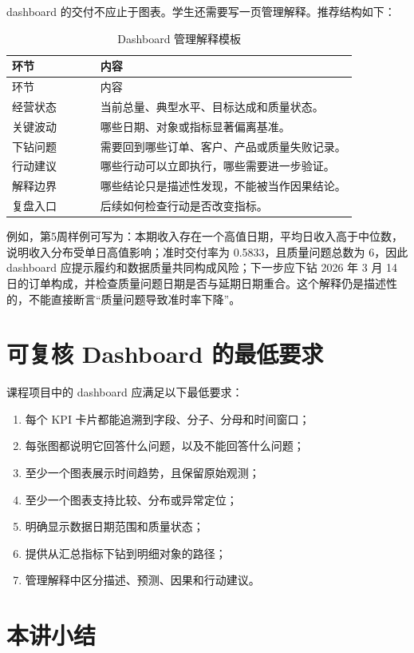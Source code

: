 \documentclass[UTF8,fontset=fandol,openany,zihao=-4]{ctexbook}
\begin{document}
dashboard 的交付不应止于图表。学生还需要写一页管理解释。推荐结构如下：
\begin{longtable}{>{\raggedright\arraybackslash}p{0.22\linewidth}>{\raggedright\arraybackslash}p{0.64\linewidth}}
\caption{Dashboard 管理解释模板}\\
\toprule
环节 & 内容\\
\midrule
\endfirsthead
\toprule
环节 & 内容\\
\midrule
\endhead
经营状态 & 当前总量、典型水平、目标达成和质量状态。\\
关键波动 & 哪些日期、对象或指标显著偏离基准。\\
下钻问题 & 需要回到哪些订单、客户、产品或质量失败记录。\\
行动建议 & 哪些行动可以立即执行，哪些需要进一步验证。\\
解释边界 & 哪些结论只是描述性发现，不能被当作因果结论。\\
复盘入口 & 后续如何检查行动是否改变指标。\\
\bottomrule
\end{longtable}

例如，第5周样例可写为：本期收入存在一个高值日期，平均日收入高于中位数，说明收入分布受单日高值影响；准时交付率为 0.5833，且质量问题总数为 6，因此 dashboard 应提示履约和数据质量共同构成风险；下一步应下钻 2026 年 3 月 14 日的订单构成，并检查质量问题日期是否与延期日期重合。这个解释仍是描述性的，不能直接断言“质量问题导致准时率下降”。

\section{可复核 Dashboard 的最低要求}

课程项目中的 dashboard 应满足以下最低要求：
\begin{enumerate}
  \item 每个 KPI 卡片都能追溯到字段、分子、分母和时间窗口；
  \item 每张图都说明它回答什么问题，以及不能回答什么问题；
  \item 至少一个图表展示时间趋势，且保留原始观测；
  \item 至少一个图表支持比较、分布或异常定位；
  \item 明确显示数据日期范围和质量状态；
  \item 提供从汇总指标下钻到明细对象的路径；
  \item 管理解释中区分描述、预测、因果和行动建议。
\end{enumerate}

\section*{本讲小结}
\end{document}
